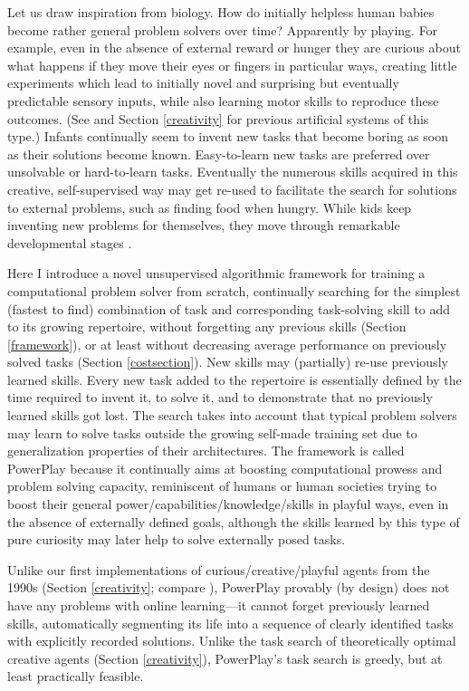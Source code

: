 \documentclass{article}
\begin{document}
Let us draw inspiration from biology.
How do initially helpless human babies become rather general problem solvers over time?
Apparently by playing. For example, even in the absence of external reward or hunger they are curious about what happens if they move their eyes or fingers in particular ways, creating little experiments which lead to initially novel and surprising but eventually predictable sensory inputs, while also  learning motor skills to reproduce these outcomes. (See \cite{Schmidhuber:90sab,Schmidhuber:91singaporecur,Schmidhuber:99cec,Schmidhuber:06cs,Schmidhuber:10ieeetamd,sunyi2011agi} and Section \ref{creativity} for previous artificial systems of this type.) Infants continually seem to invent new tasks that become boring as soon as their solutions become  known. Easy-to-learn new tasks are preferred over unsolvable or hard-to-learn tasks. Eventually the numerous skills acquired in this creative, self-supervised way may get re-used to facilitate the search for solutions to  external problems, such as finding food when hungry.
While kids keep inventing new problems for themselves, they move through remarkable developmental stages \cite{Piaget:55,Berlyne:54,Harlow:50}.

Here I introduce a novel unsupervised algorithmic framework for 
training a computational problem solver from scratch, continually searching
for the simplest (fastest to find) combination of 
 task and corresponding task-solving skill to add to its growing repertoire, 
without forgetting any previous skills (Section \ref{framework}),
 or at least without decreasing average performance on previously solved tasks (Section  \ref{costsection}).
New skills may (partially) re-use previously learned skills.
Every new task added to the repertoire is essentially defined by the time required 
to invent it, to solve it, and to demonstrate that no previously learned skills got lost.
The search 
takes into account that typical problem solvers may learn to solve tasks outside the growing self-made training set 
due to generalization properties of their architectures. 
The framework is called {\sc PowerPlay}  because it continually \cite{Ring:94}
aims at boosting computational prowess and problem solving capacity,
reminiscent of humans or human societies 
trying to boost their general power/capabilities/knowledge/skills  in playful ways, even in the absence of
externally defined goals, although 
the skills learned by this type of pure curiosity may later help to solve 
externally posed tasks.

Unlike our first implementations of curious/creative/playful agents
from the 1990s  \cite{Schmidhuber:91singaporecur,Storck:95,Schmidhuber:99cec} (Section \ref{creativity}; compare
  \cite{Barto:12intrinsic,Dayan:12intrinsic,Oudeyer:12intrinsic,Nemzhov:12intrinsic}),
{\sc PowerPlay} provably (by design) does not have any problems with online learning---it cannot forget previously learned 
skills, automatically segmenting its life into a sequence of clearly identified tasks with explicitly recorded solutions.
Unlike the task search of theoretically optimal creative agents  \cite{Schmidhuber:06cs,Schmidhuber:10ieeetamd} 
(Section \ref{creativity}), {\sc PowerPlay}'s
task search is greedy, but at least practically feasible.
\end{document}
